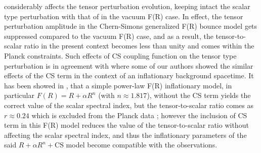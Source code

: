 \documentclass{article}
\begin{document}
considerably affects the tensor perturbation evolution, keeping intact the scalar type perturbation with that of in the vacuum F(R) case. In effect, 
the tensor perturbation amplitude in the Chern-Simons generalized F(R) bounce model gets suppressed compared to the vacuum F(R) case, 
and as a result, the tensor-to-scalar ratio in the present context becomes less than unity and comes within the Planck constraints. 
Such effects of CS coupling function on the tensor type perturbation is in agreement 
with \cite{Odintsov:2019mlf} where some of our authors showed the similar effects of the CS term in the context of an inflationary background spacetime. 
It has been showed in \cite{Odintsov:2019mlf}, that a simple power-law F(R) inflationary model, 
in particular $F(R) = R + \alpha R^{n}$ (with $n \approx 1.817$), 
without the CS term yields the correct value of the scalar spectral index, but the tensor-to-scalar ratio comes as 
$r \approx 0.24$ which is excluded from the Planck data \cite{Akrami:2018odb}; however the 
inclusion of CS term in this F(R) model reduces the value of the tensor-to-scalar ratio without affecting 
the scalar spectral index, and thus the inflationary parameters of the said $R+\alpha R^{n}+\mathrm{CS}$ model become compatible with the observations.\\ 
\end{document}
